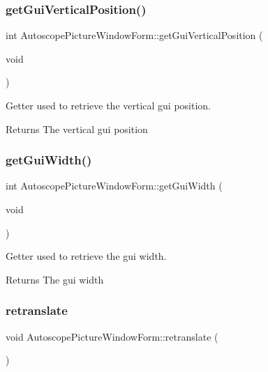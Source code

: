 \subsubsection{\texorpdfstring{getGuiVerticalPosition()}{getGuiVerticalPosition()}}
{\footnotesize\ttfamily int Autoscope\+Picture\+Window\+Form\+::get\+Gui\+Vertical\+Position (\begin{DoxyParamCaption}\item[{void}]{ }\end{DoxyParamCaption})}



Getter used to retrieve the vertical gui position. 

\begin{DoxyReturn}{Returns}
The vertical gui position 
\end{DoxyReturn}
\mbox{\label{class_autoscope_picture_window_form_a7e8d04d5bf4eafc415a9d6176a2325e9}} 
\subsubsection{\texorpdfstring{getGuiWidth()}{getGuiWidth()}}
{\footnotesize\ttfamily int Autoscope\+Picture\+Window\+Form\+::get\+Gui\+Width (\begin{DoxyParamCaption}\item[{void}]{ }\end{DoxyParamCaption})}



Getter used to retrieve the gui width. 

\begin{DoxyReturn}{Returns}
The gui width 
\end{DoxyReturn}
\mbox{\label{class_autoscope_picture_window_form_a4bcc43707d7b76b19d81ffc66a4b7ee2}} 
\subsubsection{\texorpdfstring{retranslate}{retranslate}}
{\footnotesize\ttfamily void Autoscope\+Picture\+Window\+Form\+::retranslate (\begin{DoxyParamCaption}{ }\end{DoxyParamCaption})\hspace{0.3cm}{\ttfamily [slot]}}




